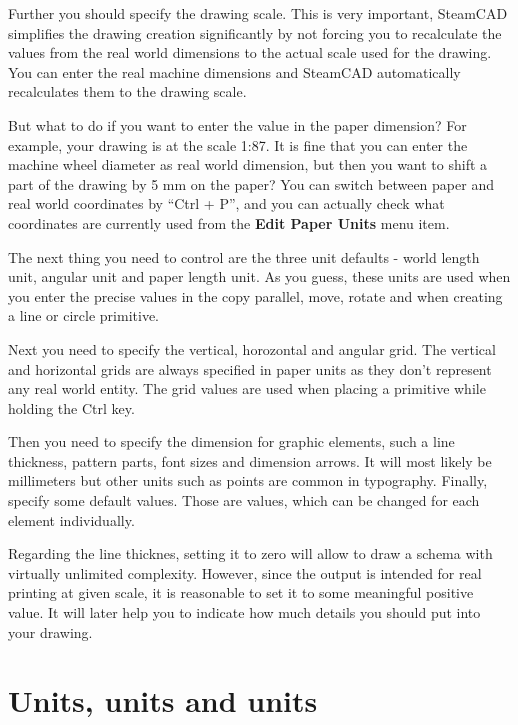 Further you should specify the drawing scale. This is very important, SteamCAD
simplifies the drawing creation significantly by not forcing you to recalculate
the values from the real world dimensions to the actual scale used for the drawing.
You can enter the real machine dimensions and SteamCAD automatically recalculates
them to the drawing scale.

But what to do if you want to enter the value in the paper dimension? For example,
your drawing is at the scale 1:87. It is fine that you can enter the machine
wheel diameter as real world dimension, but then you want to shift a part of the
drawing by 5 mm on the paper? You can switch between paper and real world
coordinates by ``Ctrl + P'', and you can actually check what coordinates are
currently used from the \textbf{Edit \lar{} Paper Units} menu item.

The next thing you need to control are the three unit defaults - world length
unit, angular unit and paper length unit. As you guess, these units are used
when you enter the precise values in the copy parallel, move, rotate and when
creating a line or circle primitive.

Next you need to specify the vertical, horozontal and angular grid. The vertical
and horizontal grids are always specified in paper units as they don't represent
any real world entity. The grid values are used when placing a primitive while
holding the Ctrl key.

Then you need to specify the dimension for graphic elements, such a line thickness,
pattern parts, font sizes and dimension arrows. It will most likely be millimeters
but other units such as points are common in typography. Finally, specify some
default values. Those are values, which can be changed for each element individually.

Regarding the line thicknes, setting it to zero will allow to draw a schema
with virtually unlimited complexity. However, since the output is intended for
real printing at given scale, it is reasonable to set it to some meaningful positive
value. It will later help you to indicate how much details you should put into
your drawing.


\section{Units, units and units}\label{sec:units}

